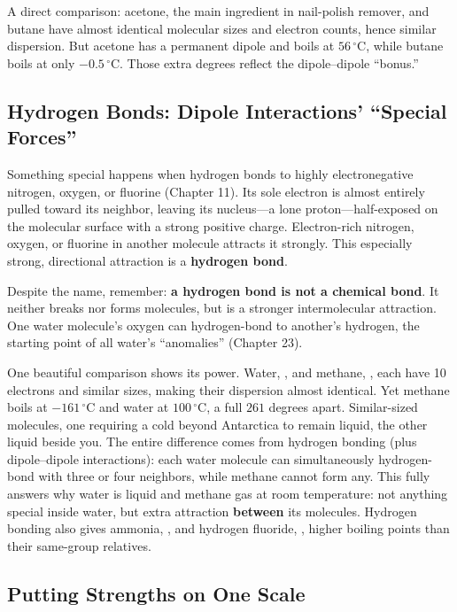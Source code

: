 A direct comparison: acetone, the main ingredient in nail-polish remover, and butane have almost identical molecular sizes and electron counts, hence similar dispersion. But acetone has a permanent dipole and boils at $56\,^{\circ}\mathrm{C}$, while butane boils at only $-0.5\,^{\circ}\mathrm{C}$. Those extra degrees reflect the dipole--dipole ``bonus.''

\subsection{Hydrogen Bonds: Dipole Interactions' ``Special Forces''}

Something special happens when hydrogen bonds to highly electronegative nitrogen, oxygen, or fluorine (Chapter 11). Its sole electron is almost entirely pulled toward its neighbor, leaving its nucleus---a lone proton---half-exposed on the molecular surface with a strong positive charge. Electron-rich nitrogen, oxygen, or fluorine in another molecule attracts it strongly. This especially strong, directional attraction is a \textbf{hydrogen bond}.

Despite the name, remember: \textbf{a hydrogen bond is not a chemical bond}. It neither breaks nor forms molecules, but is a stronger intermolecular attraction. One water molecule's oxygen can hydrogen-bond to another's hydrogen, the starting point of all water's ``anomalies'' (Chapter 23).

One beautiful comparison shows its power. Water, , and methane, , each have 10 electrons and similar sizes, making their dispersion almost identical. Yet methane boils at $-161\,^{\circ}\mathrm{C}$ and water at $100\,^{\circ}\mathrm{C}$, a full $261$ degrees apart. Similar-sized molecules, one requiring a cold beyond Antarctica to remain liquid, the other liquid beside you. The entire difference comes from hydrogen bonding (plus dipole--dipole interactions): each water molecule can simultaneously hydrogen-bond with three or four neighbors, while methane cannot form any. This fully answers why water is liquid and methane gas at room temperature: not anything special inside water, but extra attraction \textbf{between} its molecules. Hydrogen bonding also gives ammonia, , and hydrogen fluoride, , higher boiling points than their same-group relatives.

\subsection{Putting Strengths on One Scale}

